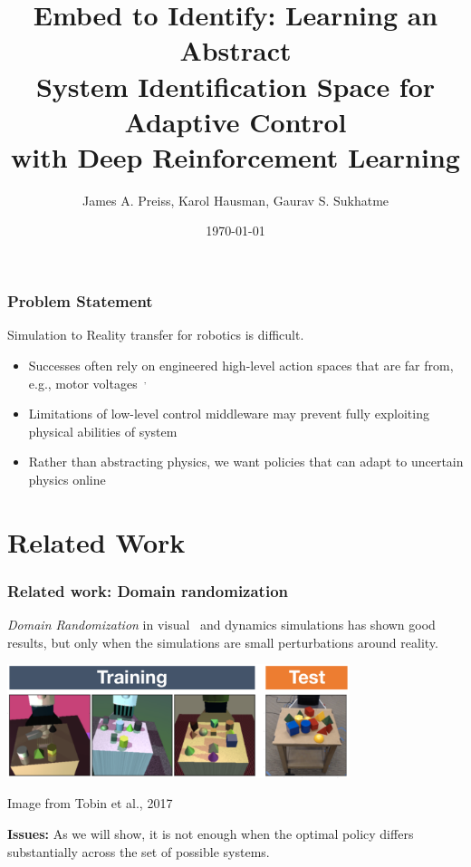 \documentclass{beamer}
\title[Embed to Identify]{Embed to Identify: Learning an Abstract \\
System Identification Space for Adaptive Control\\ with Deep Reinforcement Learning}
\author[James A. Preiss et al.]{James A. Preiss, Karol Hausman, Gaurav S. Sukhatme}
\institute[USC]{University of Southern California}
\date{\monthyear\today}
\begin{document}
\frame{\titlepage}


\begin{frame}
\frametitle{Problem Statement}
Simulation to Reality transfer for robotics is difficult.

\begin{itemize}
\item Successes often rely on engineered high-level action spaces that are far from, e.g., motor voltages~$^,$

\item Limitations of low-level control middleware may prevent fully exploiting physical abilities of system
\item Rather than abstracting physics, we want policies that can adapt to uncertain physics online
\end{itemize}
\end{frame}

\section{Related Work}

\begin{frame}
\frametitle{Related work: Domain randomization}
\emph{Domain Randomization} in visual~
and dynamics simulations has shown good results,
but only when the simulations are small perturbations around reality.
\begin{center}
\includegraphics[width=0.75\textwidth]{tobin-visual-domain-randomization.png}

{\footnotesize Image from Tobin et al., 2017}
\end{center}
\textbf{Issues:}
As we will show, it is not enough when the optimal policy differs substantially across the set of possible systems.
\end{frame}
\end{document}
